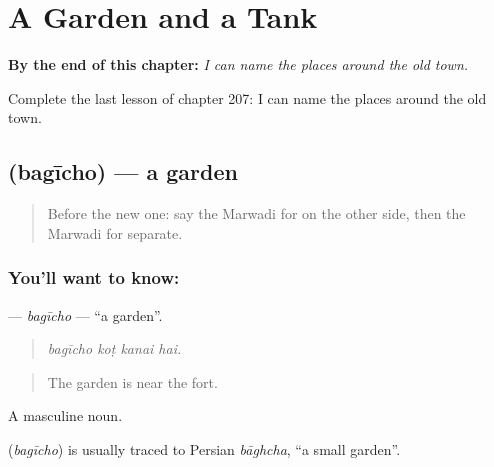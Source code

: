
\chapter{A Garden and a Tank}
\label{ch:mw-a-garden-and-a-tank}

\begin{chapteropening}
\textbf{By the end of this chapter:} \emph{I can name the places around the old town.}

Complete the last lesson of chapter 207: I can name the places around the old town.
\end{chapteropening}

\section[\texorpdfstring{\mw{बगीचो} (bagīcho)}{बगीचो (bagīcho)}]{ (bagīcho) — a garden}

\label{lesson:MW-C207-bagicho}



\begin{quote}
Before the new one: say the Marwadi for on the other side, then the Marwadi for separate.
\end{quote}

\subsection*{You'll want to know: }
\textbf{} — \emph{bagīcho} — \textquotedblleft{}a garden\textquotedblright{}.

\begin{quote}
   
\end{quote}

\begin{quote}
\emph{bagīcho koṭ kanai hai.}
\end{quote}

\begin{quote}
The garden is near the fort.
\end{quote}

A masculine noun.

\begin{cousinweb}
\textbf{} (\emph{bagīcho}) is usually traced to Persian \emph{bāghcha}, \textquotedblleft{}a small garden\textquotedblright{}.
\end{cousinweb}

